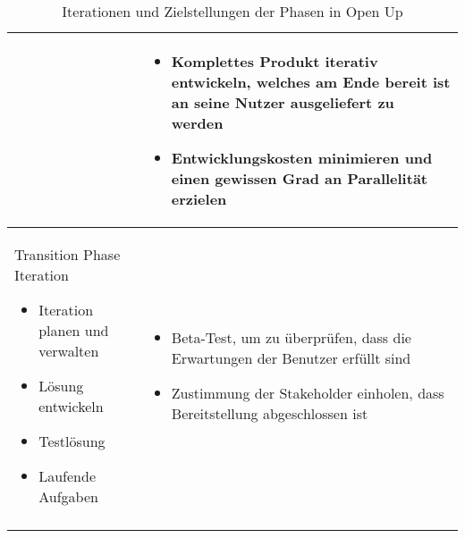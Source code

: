 \begin{longtable}{|p{7cm}|p{8cm}|}
\begin {itemize}
\end{itemize}

&
   \begin {itemize}
\item Komplettes Produkt iterativ entwickeln, welches am Ende bereit ist an seine Nutzer ausgeliefert zu werden
\item Entwicklungskosten minimieren und einen gewissen Grad an Parallelität erzielen 
\end{itemize}

 \\
\hline
Transition Phase Iteration 

   \begin {itemize}

 \item Iteration planen und verwalten
     \item Lösung entwickeln
   \item Testlösung
   \item Laufende Aufgaben

 \end{itemize}

 
  &
  
     \begin {itemize}
      \item Beta-Test, um zu überprüfen, dass die Erwartungen der Benutzer erfüllt sind 
     \item Zustimmung der Stakeholder einholen, dass Bereitstellung abgeschlossen ist
      \end{itemize}

\\

\hline

\caption{Iterationen und Zielstellungen der Phasen in Open Up \cite{eclipseopenup}}
\label{tab:tab1}
\end{longtable}






